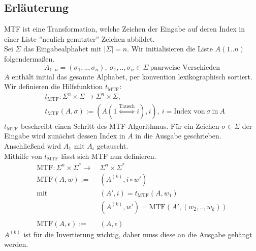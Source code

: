 \documentclass{article}
\begin{document}
\subsection{Erläuterung}
MTF ist eine Transformation, welche Zeichen der Eingabe auf deren Index in einer Liste ''neulich genutzter'' Zeichen abbildet.
\\[.5cm]
Sei $\Sigma$ das Eingabealphabet mit $|\Sigma|=n$. Wir initialisieren die Liste $A(1..n)$ folgendermaßen.
\begin{equation}
    A_{1..n}=(\sigma_1,..,\sigma_n),~\sigma_1,..,\sigma_n\in\Sigma~\text{paarweise Verschieden}
\end{equation}
$A$ enthält initial das gesamte Alphabet, per konvention lexikographisch sortiert.
\\[.5cm]
Wir definieren die Hilfsfunktion $t_{\text{MTF}}$:
\begin{equation}
\begin{split}
    &t_{\text{MTF}}:\Sigma^n\times\Sigma\rightarrow\Sigma^n\times\Sigma,\\
    &t_{\text{MTF}}(A,\sigma):=(A(1\stackrel{\text{Tausch}}{\Leftrightarrow}i),i),~i=\text{Index von}~\sigma~\text{in}~A
\end{split}
\end{equation}
$t_{\text{MTF}}$ beschreibt einen Schritt des MTF-Algorithmus. Für ein Zeichen $\sigma\in\Sigma$ der Eingabe wird zunächst dessen Index in $A$ in die Ausgabe geschrieben. Anschließend wird $A_1$ mit $A_i$ getauscht.
\\[.5cm]
Mithilfe von $t_{\text{MTF}}$ lässt sich MTF nun definieren.
\begin{equation}
\begin{split}
    \text{MTF}:\Sigma^n\times\Sigma^*\rightarrow~&\Sigma^n\times\Sigma^*\\
    \text{MTF}(A,w):=~&(A^{(k)},i\circ w')\\
    \text{mit}~&(A',i)=t_{\text{MTF}}(A,w_1)\\
    &(A^{(k)},w')=\text{MTF}(A',(w_2,..,w_k))\\
    \\
    \text{MTF}(A,\epsilon):=~&(A,\epsilon)
\end{split}
\end{equation}
$A^{(k)}$ ist für die Invertierung wichtig, daher muss diese an die Ausgabe gehängt werden.
\newpage
\end{document}
